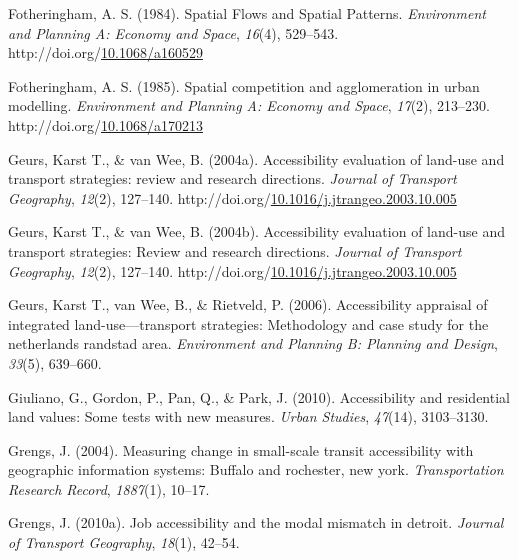 \documentclass[
11pt, %
oneside, %
english, %
singlespacing, %
]{macthesis} %
\newlength{\cslhangindent}
\newenvironment{CSLReferences}[2] %
{\begin{list}{}{%
	\setlength{\itemindent}{0pt}
	\setlength{\leftmargin}{0pt}
	\setlength{\parsep}{0pt}
	\ifodd #1
	\setlength{\leftmargin}{\cslhangindent}
	\setlength{\itemindent}{-1\cslhangindent}
	\fi
	\setlength{\itemsep}{#2\baselineskip}}}
{\end{list}}
\begin{document}
\begin{CSLReferences}{1}{0}
Fotheringham, A. S. (1984). Spatial {Flows} and {Spatial} {Patterns}. \emph{Environment and Planning A: Economy and Space}, \emph{16}(4), 529--543. http://doi.org/\href{https://doi.org/10.1068/a160529}{10.1068/a160529}

Fotheringham, A. S. (1985). Spatial competition and agglomeration in urban modelling. \emph{Environment and Planning A: Economy and Space}, \emph{17}(2), 213--230. http://doi.org/\href{https://doi.org/10.1068/a170213}{10.1068/a170213}

Geurs, Karst T., \& van Wee, B. (2004a). Accessibility evaluation of land-use and transport strategies: review and research directions. \emph{Journal of Transport Geography}, \emph{12}(2), 127--140. http://doi.org/\href{https://doi.org/10.1016/j.jtrangeo.2003.10.005}{10.1016/j.jtrangeo.2003.10.005}

Geurs, Karst T., \& van Wee, B. (2004b). Accessibility evaluation of land-use and transport strategies: Review and research directions. \emph{Journal of Transport Geography}, \emph{12}(2), 127--140. http://doi.org/\href{https://doi.org/10.1016/j.jtrangeo.2003.10.005}{10.1016/j.jtrangeo.2003.10.005}

Geurs, Karst T., van Wee, B., \& Rietveld, P. (2006). Accessibility appraisal of integrated land-use---transport strategies: Methodology and case study for the netherlands randstad area. \emph{Environment and Planning B: Planning and Design}, \emph{33}(5), 639--660.

Giuliano, G., Gordon, P., Pan, Q., \& Park, J. (2010). Accessibility and residential land values: Some tests with new measures. \emph{Urban Studies}, \emph{47}(14), 3103--3130.

Grengs, J. (2004). Measuring change in small-scale transit accessibility with geographic information systems: Buffalo and rochester, new york. \emph{Transportation Research Record}, \emph{1887}(1), 10--17.

Grengs, J. (2010a). Job accessibility and the modal mismatch in detroit. \emph{Journal of Transport Geography}, \emph{18}(1), 42--54.


\end{CSLReferences}
\end{document}
